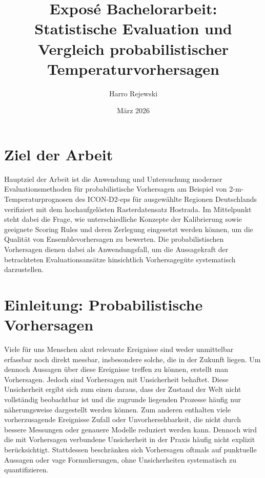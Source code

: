 \documentclass{article}
\title{Exposé Bachelorarbeit: \\ \large Statistische Evaluation und Vergleich probabilistischer Temperaturvorhersagen}
\author{Harro Rejewski}
\date{März 2026}
\numberwithin{equation}{section}
\begin{document}
\maketitle


\section{Ziel der Arbeit}
Hauptziel der Arbeit ist die Anwendung und Untersuchung moderner Evaluationsmethoden für probabilistische Vorhersagen am Beispiel von 2-m-Temperaturprognosen des ICON-D2-eps für ausgewählte Regionen Deutschlands verifiziert mit dem hochaufgelösten Rasterdatensatz Hostrada. Im Mittelpunkt steht dabei die Frage, wie unterschiedliche Konzepte der Kalibrierung sowie geeignete Scoring Rules und deren Zerlegung eingesetzt werden können, um die Qualität von Ensemblevorhersagen zu bewerten. Die probabilistischen Vorhersagen dienen dabei als Anwendungsfall, um die Aussagekraft der betrachteten Evaluationsansätze hinsichtlich Vorhersagegüte systematisch darzustellen.

\section{Einleitung: Probabilistische Vorhersagen}
Viele für uns Menschen akut relevante Ereignisse sind weder unmittelbar erfassbar noch direkt messbar, insbesondere solche, die in der Zukunft liegen. Um dennoch Aussagen über diese Ereignisse treffen zu können, erstellt man Vorhersagen. Jedoch sind Vorhersagen mit Unsicherheit behaftet. Diese Unsicherheit ergibt sich zum einen daraus, dass der Zustand der Welt nicht vollständig beobachtbar ist und die zugrunde liegenden Prozesse häufig nur näherungsweise dargestellt werden können. Zum anderen enthalten viele vorherzusagende Ereignisse Zufall oder Unvorhersehbarkeit, die nicht durch bessere Messungen oder genauere Modelle reduziert werden kann. Dennoch wird die mit Vorhersagen verbundene Unsicherheit in der Praxis häufig nicht explizit berücksichtigt. Stattdessen beschränken sich Vorhersagen oftmals auf punktuelle Aussagen oder vage Formulierungen, ohne Unsicherheiten systematisch zu quantifizieren.
\end{document}
